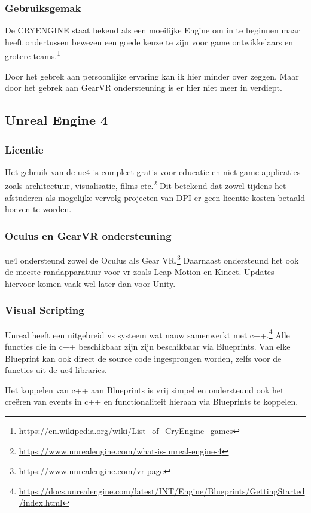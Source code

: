 \subsubsection{Gebruiksgemak}
De CRYENGINE staat bekend als een moeilijke Engine om in te beginnen maar heeft ondertussen bewezen een goede keuze te zijn voor game ontwikkelaars en grotere teams.\footnote{\url{https://en.wikipedia.org/wiki/List_of_CryEngine_games}}

Door het gebrek aan persoonlijke ervaring kan ik hier minder over zeggen. Maar door het gebrek aan GearVR ondersteuning is er hier niet meer in verdiept.

\subsection{Unreal Engine 4}
\subsubsection{Licentie}
Het gebruik van de \gls{ue4} is compleet gratis voor educatie en niet-game applicaties zoals architectuur, visualisatie, films etc.\footnote{\url{https://www.unrealengine.com/what-is-unreal-engine-4}} Dit betekend dat zowel tijdens het afstuderen als mogelijke vervolg projecten van DPI er geen licentie kosten betaald hoeven te worden.

\subsubsection{Oculus en GearVR ondersteuning}
\gls{ue4} ondersteund zowel de Oculus als Gear VR.\footnote{\url{https://www.unrealengine.com/vr-page}} Daarnaast ondersteund het ook de meeste randapparatuur voor \gls{vr} zoals Leap Motion en Kinect. Updates hiervoor komen vaak wel later dan voor Unity.

\subsubsection{Visual Scripting}
Unreal heeft een uitgebreid \gls{vs} systeem wat nauw samenwerkt met c++.\footnote{\url{https://docs.unrealengine.com/latest/INT/Engine/Blueprints/GettingStarted/index.html}} Alle functies die in c++ beschikbaar zijn zijn beschikbaar via Blueprints. Van elke Blueprint kan ook direct de source code ingesprongen worden, zelfs voor de functies uit de \gls{ue4} libraries.

Het koppelen van c++ aan Blueprints is vrij simpel en ondersteund ook het creëren van events in c++ en functionaliteit hieraan via Blueprints te koppelen.

